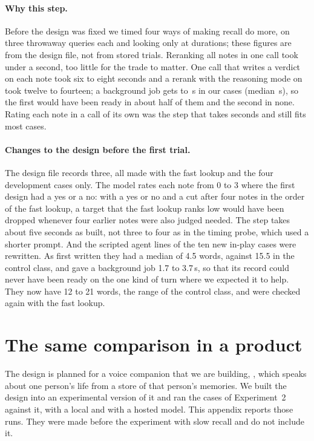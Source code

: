 \documentclass[10pt]{article}
\begin{document}
\paragraph{Why this step.} Before the design was fixed we timed four ways of making recall do more, on three throwaway queries each and looking only at durations; these figures are from the design file, not from stored trials. Reranking all \SCandidates{} notes in one call took under a second, too little for the trade to matter. One call that writes a verdict on each note took six to eight seconds and a rerank with the reasoning mode on took twelve to fourteen; a background job gets \SAvailMin{} to \SAvailMax\,s in our cases (median \SAvailMed\,s), so the first would have been ready in about half of them and the second in none. Rating each note in a call of its own was the step that takes seconds and still fits most cases.

\paragraph{Changes to the design before the first trial.} The design file records three, all made with the fast lookup and the four development cases only. The model rates each note from 0 to 3 where the first design had a yes or a no: with a yes or no and a cut after four notes in the order of the fast lookup, a target that the fast lookup ranks low would have been dropped whenever four earlier notes were also judged needed. The step takes about five seconds as built, not three to four as in the timing probe, which used a shorter prompt. And the scripted agent lines of the ten new in-play cases were rewritten. As first written they had a median of 4.5 words, against 15.5 in the control class, and gave a background job 1.7 to 3.7\,s, so that its record could never have been ready on the one kind of turn where we expected it to help. They now have 12 to 21 words, the range of the control class, and were checked again with the fast lookup.

\section{The same comparison in a product}
\label{app:e3}

The design is planned for a voice companion that we are building\ifanon\else, \product{}\fi, which speaks about one person's life from a store of that person's memories. We built the design into an experimental version of it and ran the cases of Experiment~2 against it, with a local and with a hosted model. This appendix reports those runs. They were made before the experiment with slow recall and do not include it.
\end{document}
